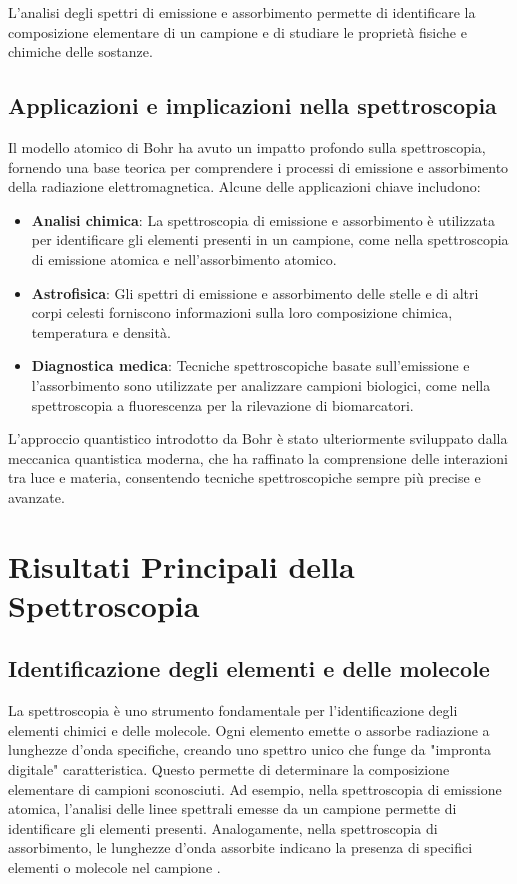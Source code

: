 \documentclass[12pt,a4paper]{report}
\begin{document}
L'analisi degli spettri di emissione e assorbimento permette di identificare la composizione elementare di un campione e di studiare le proprietà fisiche e chimiche delle sostanze.

\subsection{Applicazioni e implicazioni nella spettroscopia}

Il modello atomico di Bohr ha avuto un impatto profondo sulla spettroscopia, fornendo una base teorica per comprendere i processi di emissione e assorbimento della radiazione elettromagnetica. Alcune delle applicazioni chiave includono:

\begin{itemize}
\item \textbf{Analisi chimica}: La spettroscopia di emissione e assorbimento è utilizzata per identificare gli elementi presenti in un campione, come nella spettroscopia di emissione atomica e nell'assorbimento atomico.
\item \textbf{Astrofisica}: Gli spettri di emissione e assorbimento delle stelle e di altri corpi celesti forniscono informazioni sulla loro composizione chimica, temperatura e densità.
\item \textbf{Diagnostica medica}: Tecniche spettroscopiche basate sull'emissione e l'assorbimento sono utilizzate per analizzare campioni biologici, come nella spettroscopia a fluorescenza per la rilevazione di biomarcatori.
\end{itemize}

L'approccio quantistico introdotto da Bohr è stato ulteriormente sviluppato dalla meccanica quantistica moderna, che ha raffinato la comprensione delle interazioni tra luce e materia, consentendo tecniche spettroscopiche sempre più precise e avanzate.

\section{Risultati Principali della Spettroscopia}

\subsection{Identificazione degli elementi e delle molecole}

La spettroscopia è uno strumento fondamentale per l'identificazione degli elementi chimici e delle molecole. Ogni elemento emette o assorbe radiazione a lunghezze d'onda specifiche, creando uno spettro unico che funge da "impronta digitale" caratteristica. Questo permette di determinare la composizione elementare di campioni sconosciuti. Ad esempio, nella spettroscopia di emissione atomica, l'analisi delle linee spettrali emesse da un campione permette di identificare gli elementi presenti. Analogamente, nella spettroscopia di assorbimento, le lunghezze d'onda assorbite indicano la presenza di specifici elementi o molecole nel campione \cite{strasburger2014spectroscopy}.
\end{document}
